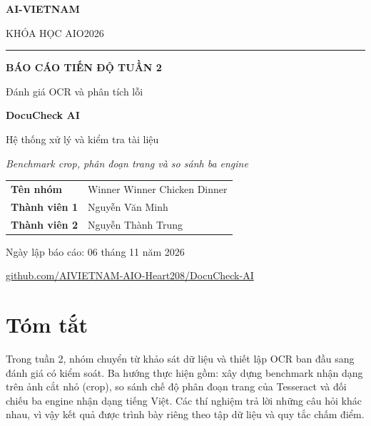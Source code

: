 \documentclass[11pt,a4paper]{article}
\renewcommand{\arraystretch}{1.25}
\begin{document}
\color{ink}

\begin{titlepage}
\thispagestyle{empty}
\centering
\setlength{\parskip}{0pt}
\vspace*{7mm}
{\sffamily\fontsize{16}{21}\selectfont\bfseries\color{navy}AI-VIETNAM}\par
\vspace{3mm}
{\sffamily\fontsize{11}{16}\selectfont KHÓA HỌC AIO2026}\par
\vspace{7mm}
{\color{navy!35}\rule{72mm}{.45pt}}\par
\vspace{25mm}
{\fontsize{23}{31}\selectfont\bfseries\color{navy}BÁO CÁO TIẾN ĐỘ TUẦN 2}\par
\vspace{5mm}
{\sffamily\fontsize{12}{17}\selectfont\color{teal}Đánh giá OCR và phân tích lỗi}\par
\vspace{17mm}
{\fontsize{29}{35}\selectfont\bfseries\color{navy}DocuCheck AI}\par
\vspace{3mm}
{\fontsize{14}{19}\selectfont Hệ thống xử lý và kiểm tra tài liệu}\par
\vspace{7mm}
{\fontsize{11}{16}\selectfont\itshape
Benchmark crop, phân đoạn trang và so sánh ba engine}\par
\vspace{24mm}
\begin{minipage}{114mm}
\normalsize
\renewcommand{\arraystretch}{1.65}
\begin{tabularx}{\linewidth}{@{}P{32mm}Y@{}}
\textbf{Tên nhóm} & Winner Winner Chicken Dinner\\
\textbf{Thành viên 1} & Nguyễn Văn Minh\\
\textbf{Thành viên 2} & Nguyễn Thành Trung\\
\end{tabularx}
\end{minipage}
\vfill
{\small Ngày lập báo cáo: 06 tháng 11 năm 2026}\par
\vspace{6mm}
{\footnotesize\href{https://github.com/AIVIETNAM-AIO-Heart208/DocuCheck-AI}{\textsf{github.com/AIVIETNAM-AIO-Heart208/DocuCheck-AI}}}\par
\vspace*{8mm}
\end{titlepage}

\section*{Tóm tắt}
Trong tuần 2, nhóm chuyển từ khảo sát dữ liệu và thiết lập OCR ban đầu sang đánh giá có kiểm soát. Ba hướng thực hiện gồm: xây dựng benchmark nhận dạng trên ảnh cắt nhỏ (crop), so sánh chế độ phân đoạn trang của Tesseract và đối chiếu ba engine nhận dạng tiếng Việt. Các thí nghiệm trả lời những câu hỏi khác nhau, vì vậy kết quả được trình bày riêng theo tập dữ liệu và quy tắc chấm điểm.
\end{document}
